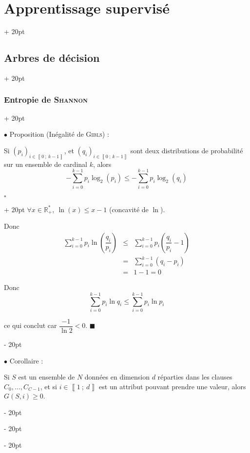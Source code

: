 \documentclass[a4paper, 12pt, twoside]{article}
\newcommand{\R}{\mathbb{R}} %
\newcommand{\nset}[2]{\left\llbracket #1\ ;\ #2 \right\rrbracket}
\newcommand{\lr}[1]{\left( #1 \right)}
\renewcommand{\le}{\leqslant}
\renewcommand{\ge}{\geqslant}
\newcommand{\ind}[1][20pt]{\advance\leftskip + #1}
\newcommand{\deind}[1][20pt]{\advance\leftskip - #1}
\newenvironment{indt}[2][20pt]{#2 \par \ind[#1]}{\par \deind} %
\newenvironment{proof}[1][{}]{\begin{indt}{$\square$ #1}}{$\blacksquare$ \end{indt}}
\begin{document}
\begin{indt}{\section{Apprentissage supervisé}}
\begin{indt}{\subsection{Arbres de décision}}
\begin{indt}{\subsubsection{Entropie de \textsc{Shannon}}}
                \vspace{12pt}
                
                $\bullet$ Proposition (Inégalité de \textsc{Gibls}) :
                \begin{emphBox}
                    Si $\lr{p_i}_{i \in \nset 0 {k - 1}}$, et $\lr{q_i}_{i \in \nset 0 {k - 1}}$ sont deux distributions de probabilité sur un ensemble de cardinal $k$, alors
                    \[
                        -\sum_{i = 0}^{k - 1} p_i \log_2(p_i)
                        \le
                        -\sum_{i = 0}^{k - 1} p_i \log_2(q_i)
                    \]
                \end{emphBox}

                \vspace{6pt}
                
                \begin{proof}
                    $\forall x \in \R^*_+,\ \ln(x) \le x - 1$ (concavité de $\ln$).

                    Donc
                    \[
                        \begin{array}{rcl}
                            \displaystyle
                            \sum_{i = 0}^{k - 1} p_i \ln\!\lr{\dfrac{q_i}{p_i}}
                            &\le& \displaystyle
                            \sum_{i = 0}^{k - 1} p_i \lr{\dfrac{q_i}{p_i} - 1}
                            \\
                            &=& \displaystyle
                            \sum_{i = 0}^{k - 1} (q_i - p_i)
                            \\
                            &=& 1 - 1 = 0
                        \end{array}
                    \]

                    Donc
                    \[
                        \sum_{i = 0}^{k - 1} p_i \ln q_i
                        \le
                        \sum_{i = 0}^{k - 1} p_i \ln p_i
                    \]

                    ce qui conclut car $\dfrac{-1}{\ln 2} < 0$.
                \end{proof}

                \vspace{12pt}
                
                $\bullet$ Corollaire :
                \begin{emphBox}
                    Si $S$ est un ensemble de $N$ données en dimension $d$ réparties dans les clauses $C_0, \ldots, C_{C - 1}$, et si $i \in \nset 1 d$ est un attribut pouvant prendre une valeur, alors $G(S, i) \ge 0$.
                \end{emphBox}


\end{indt}
\end{indt}
\end{indt}
\end{document}
